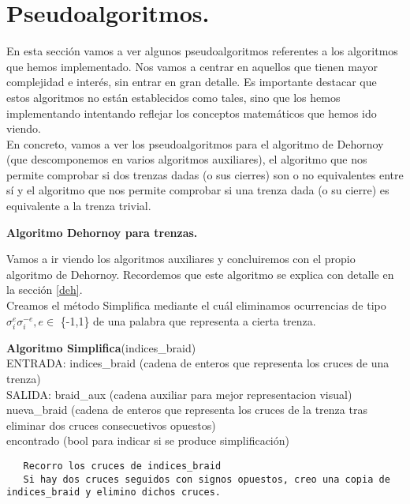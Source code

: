 
\section{Pseudoalgoritmos.}
En esta sección vamos a ver algunos pseudoalgoritmos referentes a los algoritmos que hemos implementado. Nos vamos a centrar en aquellos que tienen mayor complejidad e interés, sin entrar en gran detalle. Es importante destacar que estos algoritmos no están establecidos como tales, sino que los hemos implementando intentando reflejar los conceptos matemáticos que hemos ido viendo. \\

En concreto, vamos a ver los pseudoalgoritmos para el algoritmo de Dehornoy (que descomponemos en varios algoritmos auxiliares), el algoritmo que nos permite comprobar si dos trenzas dadas (o sus cierres) son o no equivalentes entre sí y el algoritmo que nos permite comprobar si una trenza dada (o su cierre) es equivalente a la trenza trivial.\\

\begin{center}
	\textbf{Algoritmo Dehornoy para trenzas.}
\end{center} 
Vamos a ir viendo los algoritmos auxiliares y concluiremos con el propio algoritmo de Dehornoy. Recordemos que este algoritmo se explica con detalle en la sección \ref{deh}.\\

Creamos el método Simplifica mediante el cuál eliminamos ocurrencias de tipo $\sigma_{i}^{e}\sigma_{i}^{-e}, e \in$ \{-1,1\} de una palabra que representa a cierta trenza. 

\begin{alg}
	\textbf{Algoritmo Simplifica}(indices\_braid)\\
	ENTRADA: indices\_braid (cadena de enteros que representa los cruces de una trenza)\\
	SALIDA: \hspace{0.4cm} braid\_aux (cadena auxiliar para mejor representacion visual) \\
    \hspace*{2.2cm} nueva\_braid (cadena de enteros que representa los cruces de la trenza tras eliminar dos cruces consecuetivos opuestos)\\
    \hspace*{2.2cm} encontrado (bool para indicar si se produce simplificación)
	
\begin{lstlisting}
   Recorro los cruces de indices_braid
   Si hay dos cruces seguidos con signos opuestos, creo una copia de indices_braid y elimino dichos cruces. 
\end{lstlisting}
\end{alg}

